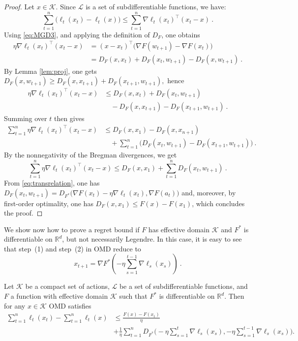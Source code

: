 \documentclass[11pt]{hackednow}
\newcommand{\R}{\mathbb{R}}
\newcommand{\cL}{\mathcal{L}}
\newcommand{\cK}{\mathcal{K}}
\begin{document}
\begin{proof}
Let $x \in \cK$. Since $\cL$ is a set of subdifferentiable functions, we have:
$$\sum_{t=1}^n \bigl( \ell_t(x_t) - \ell_t(x) \bigr) \leq \sum_{t=1}^n \nabla \ell_t(x_t)^{\top} (x_t -x)~.$$
Using \eqref{eq:MGD3}, and applying the definition of $D_F$, one obtains
  \begin{align*}
  \eta \nabla \ell_t(x_t)^{\top} (x_t - x) & = (x-x_t)^{\top} \big(\nabla F(w_{t+1}) - \nabla F(x_t) \big)\\
  & = D_F(x,x_t)+D_F(x_t,w_{t+1})-D_F(x,w_{t+1})~.
  \end{align*}
By Lemma \ref{lem:proj}, one gets 
  $D_F(x,w_{t+1}) \ge D_F(x,x_{t+1}) + D_F(x_{t+1},w_{t+1}),$ hence
  \begin{align*}
  \eta \nabla \ell_t(x_t)^{\top} (x_t - x) & \le D_F(x,x_t)+D_F(x_t,w_{t+1}) \\
& \quad -D_F(x,x_{t+1})-D_F(x_{t+1},w_{t+1})~.
  \end{align*}
Summing over $t$ then gives  
  \begin{align*}
  \sum_{t=1}^n \eta \nabla \ell_t(x_t)^{\top} (x_t - x) & \le D_F(x,x_1)-D_F(x,x_{n+1}) \\
& \quad +\sum_{t=1}^n \big(D_F(x_t,w_{t+1}) -D_F(x_{t+1},w_{t+1})\big)~.
  \end{align*}
By the nonnegativity of the Bregman divergences, we get 
$$\sum_{t=1}^n \eta \nabla \ell_t(x_t)^{\top} (x_t - x)
\le D_F(x,x_1)+\sum_{t=1}^n D_F(x_t,w_{t+1})~.$$
From \eqref{eq:transrelation}, one has
  $
  D_F(x_t,w_{t+1})=D_{F^*}\big(\nabla F(x_t)- \eta \nabla \ell_t(x_t),\nabla F(a_t)\big)
  $
and, moreover, by first-order optimality, one has $D_F(x,x_1) \leq F(x) - F(x_1)$, which concludes the proof.
\end{proof}
We show now how to prove a regret bound if $F$ has effective domain $\cK$ and $F^*$ is differentiable on $\R^d$, but not necessarily Legendre. In this case, it is easy to see that step~(1) and step~(2) in OMD reduce to
\[
x_{t+1} = \nabla F^* \left( - \eta \sum_{s=1}^{t-1} \nabla \ell_s(x_s) \right)~.
\]
\begin{theorem} \label{th:Fnotlegendre}
Let $\cK$ be a compact set of actions, $\cL$ be a set of subdifferentiable functions, and $F$ a function with effective domain $\cK$ such that $F^*$ is differentiable on $\R^d$. Then for any $x \in \cK$ OMD satisfies
\begin{align*}
\sum_{t=1}^n \ell_t(x_t) - \sum_{t=1}^n \ell_t(x)
& \leq \frac{F(x) - F(x_1)}{\eta} \\
& + \frac{1}{\eta} \sum_{t=1}^n D_{F^*}\bigg(- \eta \sum_{s=1}^{t} \nabla \ell_s(x_s), - \eta \sum_{s=1}^{t-1} \nabla \ell_s(x_s) \bigg).
\end{align*}
\end{theorem}
\end{document}
